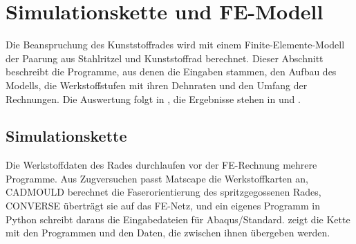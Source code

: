 
\section{Simulationskette und FE-Modell}
\label{sec:fe_modell}

Die Beanspruchung des Kunststoffrades wird mit einem Finite-Elemente-Modell der Paarung aus Stahlritzel und Kunststoffrad berechnet. Dieser Abschnitt beschreibt die Programme, aus denen die Eingaben stammen, den Aufbau des Modells, die Werkstoffstufen mit ihren Dehnraten und den Umfang der Rechnungen. Die Auswertung folgt in , die Ergebnisse stehen in  und .


\subsection{Simulationskette}
\label{sec:simulationskette}

Die Werkstoffdaten des Rades durchlaufen vor der FE-Rechnung mehrere Programme. Aus Zugversuchen passt Matscape die Werkstoffkarten an, CADMOULD berechnet die Faserorientierung des spritzgegossenen Rades, CONVERSE überträgt sie auf das FE-Netz, und ein eigenes Programm in Python schreibt daraus die Eingabedateien für Abaqus/Standard.
 zeigt die Kette mit den Programmen und den Daten, die zwischen ihnen übergeben werden.

